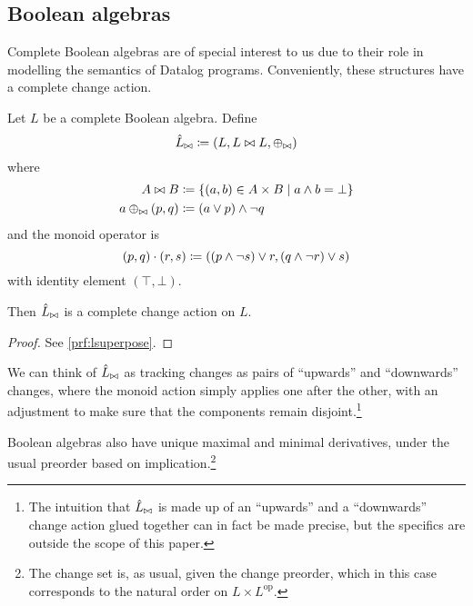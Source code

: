 \subsection{Boolean algebras}
\label{sec:booleanAlgebras}


Complete Boolean algebras are of special interest to us due to their role in modelling the semantics of
Datalog programs. Conveniently, these structures have a complete change action.

\begin{prop}[name=Boolean algebra change actions, restate=lsuperpose]
 Let $L$ be a complete Boolean algebra. Define
  \begin{displaymath}
    \hat{L}_{\bowtie} \coloneqq (L,L \bowtie L,\oplus_{\bowtie})
  \end{displaymath}
  where
  \begin{align*}
    A \bowtie B &\coloneqq \{ (a, b) \in A \times B \mid a \wedge b = \bot \}\\
    a \oplus_{\bowtie} (p, q) &\coloneqq (a \vee p) \wedge \neg q
  \end{align*}
  and the monoid operator is
  \begin{displaymath}
    (p, q) \cdot (r, s) \coloneqq ((p \wedge \neg s) \vee r, (q \wedge \neg r) \vee s)
  \end{displaymath}
  with identity element $(\top, \bot)$.

  Then $\hat{L}_{\bowtie}$ is a complete change action on $L$.
\end{prop}
\ifproofs
\begin{proof}
  See \cref{prf:lsuperpose}.
\end{proof}
\fi

We can think of $\hat{L}_{\bowtie}$ as tracking changes as pairs of ``upwards'' and
``downwards'' changes, where the monoid action simply applies one after the
other, with an adjustment to make sure that the components remain disjoint.\footnote{
  The intuition that $\hat{L}_{\bowtie}$ is made up of an ``upwards''
  and a ``downwards'' change action glued together can in fact be made precise, but the specifics
  are outside the scope of this paper.}

Boolean algebras also have unique maximal and minimal
derivatives, under the usual preorder based on implication.\footnote{The change
set is, as usual, given the change preorder, which in this case corresponds to
the natural order on $L \times L^{\textrm{op}}$.}

